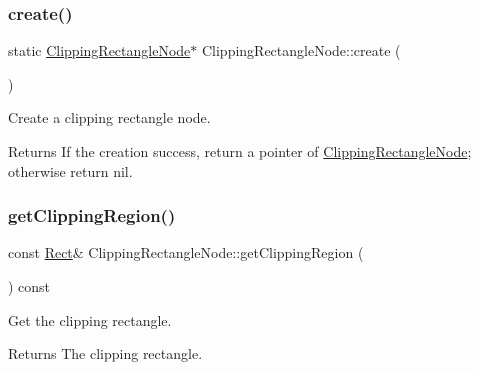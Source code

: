 \subsubsection{\texorpdfstring{create()}{create()}\hspace{0.1cm}{\footnotesize\ttfamily [4/4]}}
{\footnotesize\ttfamily static \hyperlink{classClippingRectangleNode}{Clipping\+Rectangle\+Node}$\ast$ Clipping\+Rectangle\+Node\+::create (\begin{DoxyParamCaption}{ }\end{DoxyParamCaption})\hspace{0.3cm}{\ttfamily [static]}}



Create a clipping rectangle node. 

\begin{DoxyReturn}{Returns}
If the creation success, return a pointer of \hyperlink{classClippingRectangleNode}{Clipping\+Rectangle\+Node}; otherwise return nil. 
\end{DoxyReturn}
\mbox{\label{classClippingRectangleNode_a344c7fa4f997d75ea410c6f6da3ecc40}} 
\subsubsection{\texorpdfstring{get\+Clipping\+Region()}{getClippingRegion()}\hspace{0.1cm}{\footnotesize\ttfamily [1/2]}}
{\footnotesize\ttfamily const \hyperlink{classRect}{Rect}\& Clipping\+Rectangle\+Node\+::get\+Clipping\+Region (\begin{DoxyParamCaption}{ }\end{DoxyParamCaption}) const\hspace{0.3cm}{\ttfamily [inline]}}



Get the clipping rectangle. 

\begin{DoxyReturn}{Returns}
The clipping rectangle. 
\end{DoxyReturn}
\mbox{\label{classClippingRectangleNode_a344c7fa4f997d75ea410c6f6da3ecc40}} 
